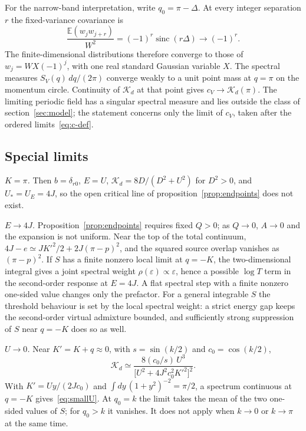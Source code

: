 \documentclass[12pt,a4paper]{article}
\theoremstyle{remark}
\newcommand{\Kd}{\mathcal{K}_d}
\newcommand{\sinc}{\operatorname{sinc}}
\newcommand{\E}{\mathbb{E}}
\newcommand{\Ustar}{U_{*}}
\begin{document}
For the narrow-band interpretation, write $q_0=\pi-\Delta$. At every integer separation $r$ the fixed-variance covariance is
\begin{equation}\label{eq:staggered-limit}
\frac{\E(w_jw_{j+r})}{W^2}=(-1)^r\sinc(r\Delta)\longrightarrow(-1)^r.
\end{equation}
The finite-dimensional distributions therefore converge to those of $w_j=WX(-1)^j$, with one real standard Gaussian variable $X$. The spectral measures $S_V(q)\,dq/(2\pi)$ converge weakly to a unit point mass at $q=\pi$ on the momentum circle. Continuity of $\Kd$ at that point gives $c_V\to\Kd(\pi)$. The limiting periodic field has a singular spectral measure and lies outside the class of section~\ref{sec:model}; the statement concerns only the limit of $c_V$, taken after the ordered limits~\eqref{eq:c-def}.

\subsection{Special limits}\label{app:P7}

\emph{$K=\pi$.} Then $b=\delta_{r0}$, $E=U$, $\Kd=8D/(D^2+U^2)$ for $D^2>0$, and $\Ustar=U_E=4J$, so the open critical line of proposition~\ref{prop:endpoints} does not exist.

\emph{$E\to4J$.} Proposition~\ref{prop:endpoints} requires fixed $Q>0$; as $Q\to0$, $A\to0$ and the expansion is not uniform. Near the top of the total continuum, $4J-e\simeq JK'^2/2+2J(\pi-p)^2$, and the squared source overlap vanishes as $(\pi-p)^2$. If $S$ has a finite nonzero local limit at $q=-K$, the two-dimensional integral gives a joint spectral weight $\rho(\varepsilon)\propto\varepsilon$, hence a possible $\log T$ term in the second-order response at $E=4J$. A flat spectral step with a finite nonzero one-sided value changes only the prefactor. For a general integrable $S$ the threshold behaviour is set by the local spectral weight: a strict energy gap keeps the second-order virtual admixture bounded, and sufficiently strong suppression of $S$ near $q=-K$ does so as well.

\emph{$U\to0$.} Near $K'=K+q\approx0$, with $s=\sin(k/2)$ and $c_0=\cos(k/2)$,
\begin{equation}
\Kd\simeq\frac{8(c_0/s)\,U^3}{\bigl[U^2+4J^2c_0^2K'^2\bigr]^2}.
\end{equation}
With $K'=Uy/(2Jc_0)$ and $\int dy\,(1+y^2)^{-2}=\pi/2$, a spectrum continuous at $q=-K$ gives~\eqref{eq:smallU}. At $q_0=k$ the limit takes the mean of the two one-sided values of $S$; for $q_0>k$ it vanishes. It does not apply when $k\to0$ or $k\to\pi$ at the same time.
\end{document}
